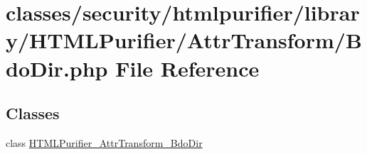 \hypertarget{BdoDir_8php}{\section{classes/security/htmlpurifier/library/\+H\+T\+M\+L\+Purifier/\+Attr\+Transform/\+Bdo\+Dir.php File Reference}
\label{BdoDir_8php}
}
\subsection*{Classes}
\begin{DoxyCompactItemize}
\item 
class \hyperlink{classHTMLPurifier__AttrTransform__BdoDir}{H\+T\+M\+L\+Purifier\+\_\+\+Attr\+Transform\+\_\+\+Bdo\+Dir}
\end{DoxyCompactItemize}
